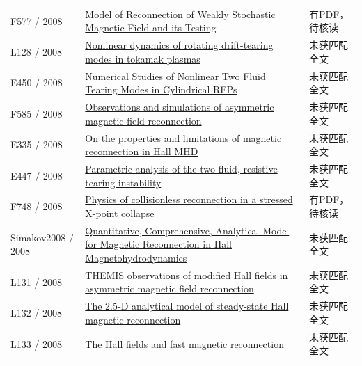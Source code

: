 \begin{longtable}{P{24mm}P{97mm}P{27mm}}
F577 / 2008 & \href{https://doi.org/10.48550/arxiv.0812.4579}{Model of Reconnection of Weakly Stochastic Magnetic Field and its Testing} & 有PDF，待核读\\

L128 / 2008 & \href{https://doi.org/10.1063/1.2980286}{Nonlinear dynamics of rotating drift-tearing modes in tokamak plasmas} & 未获匹配全文\\

E450 / 2008 & \href{http://absimage.aps.org/image/DPP08/MWS_DPP08-2008-000738.pdf}{Numerical Studies of Nonlinear Two Fluid Tearing Modes in Cylindrical RFPs} & 未获匹配全文\\

F585 / 2008 & \href{https://doi.org/10.1029/2008ja013535}{Observations and simulations of asymmetric magnetic field reconnection} & 未获匹配全文\\

E335 / 2008 & \href{https://ui.adsabs.harvard.edu/abs/2008AGUFMSM23C..05C/abstract}{On the properties and limitations of magnetic reconnection in Hall MHD} & 未获匹配全文\\

E447 / 2008 & \href{http://absimage.aps.org/image/DPP08/MWS_DPP08-2008-001107.pdf}{Parametric analysis of the two-fluid,  resistive tearing instability} & 未获匹配全文\\

F748 / 2008 & \href{https://doi.org/10.1063/1.2999532}{Physics of collisionless reconnection in a stressed X-point collapse} & 有PDF，待核读\\

Simakov2008 / 2008 & \href{https://doi.org/10.1103/physrevlett.101.105003}{Quantitative,  Comprehensive,  Analytical Model for Magnetic Reconnection in Hall Magnetohydrodynamics} & 未获匹配全文\\

L131 / 2008 & \href{https://doi.org/10.1029/2007gl033033}{THEMIS observations of modified Hall fields in asymmetric magnetic field reconnection} & 未获匹配全文\\

L132 / 2008 & \href{https://doi.org/10.1029/2007ja012852}{The 2.5‐D analytical model of steady‐state Hall magnetic reconnection} & 未获匹配全文\\

L133 / 2008 & \href{https://doi.org/10.1063/1.2901194}{The Hall fields and fast magnetic reconnection} & 未获匹配全文\\


\end{longtable}
